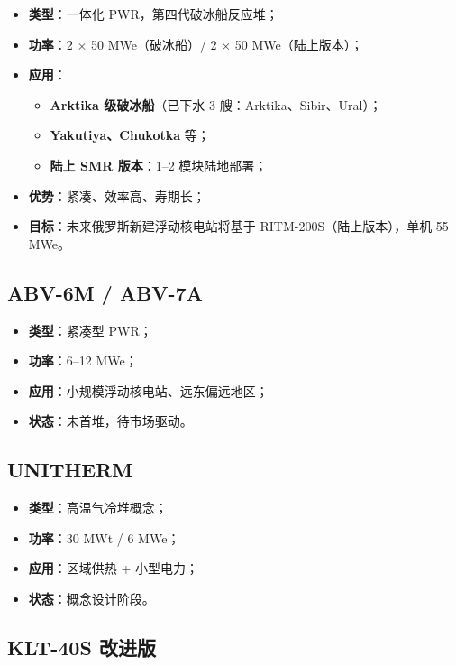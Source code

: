 \documentclass[
  UTF8,
  scheme=plain,
  fontsize=10pt,
  openany
]{ctexbook}
\begin{document}
\begin{itemize}
\tightlist
\item
  \textbf{类型}：一体化 PWR，第四代破冰船反应堆；
\item
  \textbf{功率}：2 × 50 MWe（破冰船）/ 2 × 50 MWe（陆上版本）；
\item
  \textbf{应用}：

  \begin{itemize}
  \tightlist
  \item
    \textbf{Arktika 级破冰船}（已下水 3 艘：Arktika、Sibir、Ural）；
  \item
    \textbf{Yakutiya、Chukotka} 等；
  \item
    \textbf{陆上 SMR 版本}：1--2 模块陆地部署；
  \end{itemize}
\item
  \textbf{优势}：紧凑、效率高、寿期长；
\item
  \textbf{目标}：未来俄罗斯新建浮动核电站将基于
  RITM-200S（陆上版本），单机 55 MWe。
\end{itemize}

\subsection{ABV-6M / ABV-7A}\label{abv-6m-abv-7a}

\begin{itemize}
\tightlist
\item
  \textbf{类型}：紧凑型 PWR；
\item
  \textbf{功率}：6--12 MWe；
\item
  \textbf{应用}：小规模浮动核电站、远东偏远地区；
\item
  \textbf{状态}：未首堆，待市场驱动。
\end{itemize}

\subsection{UNITHERM}\label{unitherm}

\begin{itemize}
\tightlist
\item
  \textbf{类型}：高温气冷堆概念；
\item
  \textbf{功率}：30 MWt / 6 MWe；
\item
  \textbf{应用}：区域供热 + 小型电力；
\item
  \textbf{状态}：概念设计阶段。
\end{itemize}

\subsection{KLT-40S 改进版}\label{klt-40s-ux6539ux8fdbux7248}
\end{document}
